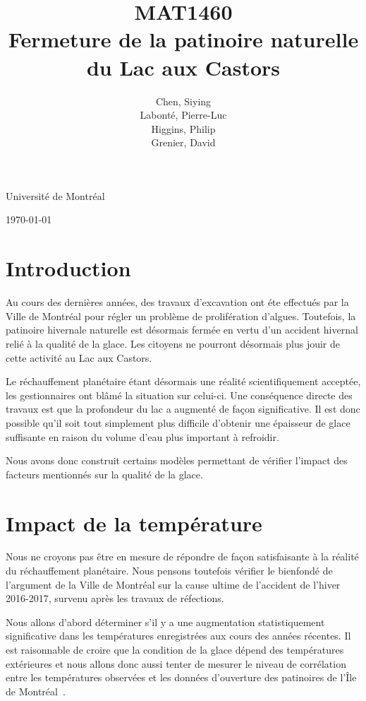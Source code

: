 \documentclass[12pt]{article}
\title{MAT1460\\[3ex]Fermeture de la patinoire naturelle du Lac aux Castors}
\author{Chen, Siying\\[1ex] Labont\'e, Pierre-Luc\\[1ex]Higgins, Philip\\[1ex] Grenier, David}
\date{}
\numberwithin{figure}{section}
\numberwithin{table}{section}
\begin{document}
\maketitle
\thispagestyle{empty}
\vfill
\begin{center}
Universit\'e de Montr\'eal

\today
\end{center}
\clearpage

\tableofcontents
\clearpage
\section{Introduction}

Au cours des derni\`eres ann\'ees, des travaux d'excavation ont \'ete effectu\'es par la Ville de
Montr\'eal pour r\'egler un probl\`eme de prolif\'eration d'algues. Toutefois, la patinoire
hivernale naturelle est d\'esormais ferm\'ee en vertu d'un accident hivernal reli\'e \`a la
qualit\'e de la glace. Les citoyens ne pourront d\'esormais plus jouir de cette activit\'e au Lac
aux Castors.

Le r\'echauffement plan\'etaire \'etant d\'esormais une r\'ealit\'e scientifiquement accept\'ee, les
gestionnaires ont bl\^am\'e la situation sur celui-ci. Une cons\'equence directe des
travaux est que la profondeur du lac a augment\'e de fa\c con significative. Il est donc possible
qu'il soit tout simplement plus difficile d'obtenir une \'epaisseur de glace suffisante en raison du
volume d'eau plus important \`a refroidir.

Nous avons donc construit certains mod\`eles permettant de v\'erifier l'impact des facteurs
mentionn\'es sur la qualit\'e de la glace.

\section{Impact de la temp\'erature}

Nous ne croyons pas \^etre en mesure de r\'epondre de fa\c con satisfaisante \`a la r\'ealit\'e du
r\'echauffement plan\'etaire. Nous pensons toutefois v\'erifier le bienfond\'e de l'argument de la
Ville de Montr\'eal sur la cause ultime de l'accident de l'hiver 2016-2017, survenu apr\`es les
travaux de r\'efections.

Nous allons d'abord d\'eterminer s'il y a une augmentation statistiquement significative dans les
temp\'eratures enregistr\'ees aux cours des ann\'ees r\'ecentes. Il est raisonnable de croire que la
condition de la glace d\'epend des temp\'eratures ext\'erieures et nous allons donc aussi tenter de
mesurer le niveau de corr\'elation entre les temp\'eratures observ\'ees et les donn\'ees d'ouverture
des patinoires de l'\^Ile de Montr\'eal~\cite{PatHist}.
\end{document}
